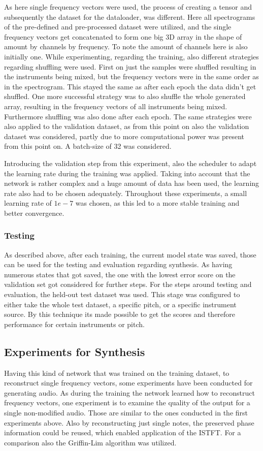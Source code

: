 As here single frequency vectors were used, the process of creating a tensor and subsequently the dataset for the dataloader, was different. Here all spectrograms of the pre-defined and pre-processed dataset were utilized, and the single frequency vectors get concatenated to form one big 3D array in the shape of amount by channels by frequency. To note the amount of channels here is also initially one. While experimenting, regarding the training, also different strategies regarding shuffling were used. First on just the samples were shuffled resulting in the instruments being mixed, but the frequency vectors were in the same order as in the spectrogram. This stayed the same as after each epoch the data didn't get shuffled. One more successful strategy was to also shuffle the whole generated array, resulting in the frequency vectors of all instruments being mixed. Furthermore shuffling was also done after each epoch. The same strategies were also applied to the validation dataset, as from this point on also the validation dataset was considered, partly due to more computational power was present from this point on. A batch-size of 32 was considered. 

Introducing the validation step from this experiment, also the scheduler to adapt the learning rate during the training was applied. Taking into account that the network is rather complex and a huge amount of data has been used, the learning rate also had to be chosen adequately. Throughout these experiments, a small learning rate of $1e-7$ was chosen, as this led to a more stable training and better convergence. 

\subsubsection{Testing}
As described above, after each training, the current model state was saved, those can be used for the testing and evaluation regarding synthesis. As having numerous states that got saved, the one with the lowest error score on the validation set got considered for further steps. For the steps around testing and evaluation, the held-out test dataset was used. This stage was configured to either take the whole test dataset, a specific pitch, or a specific instrument source. By this technique its made possible to get the scores and therefore performance for certain instruments or pitch. 

\subsection{Experiments for Synthesis}
Having this kind of network that was trained on the training dataset, to reconstruct single frequency vectors, some experiments have been conducted for generating audio. As during the training the network learned how to reconstruct frequency vectors, one experiment is to examine the quality of the output for a single non-modified audio. Those are similar to the ones conducted in the first experiments above. Also by reconstructing just single notes, the preserved phase information could be reused, which enabled application of the ISTFT. For a comparison also the Griffin-Lim algorithm was utilized.

